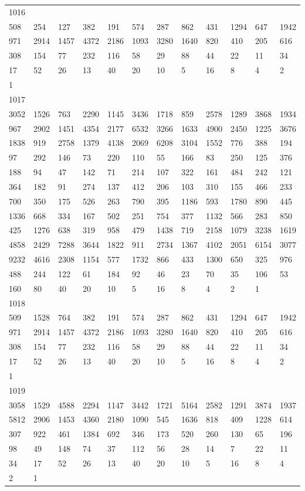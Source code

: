 \begin{longtable}{llllllllllll}
1016&&&&&&&&&&&\\
508& 254& 127& 382& 191& 574& 287& 862& 431& 1294& 647& 1942\\
971& 2914& 1457& 4372& 2186& 1093& 3280& 1640& 820& 410& 205& 616\\
308& 154& 77& 232& 116& 58& 29& 88& 44& 22& 11& 34\\
17& 52& 26& 13& 40& 20& 10& 5& 16& 8& 4& 2\\
1& \\

1017&&&&&&&&&&&\\
3052& 1526& 763& 2290& 1145& 3436& 1718& 859& 2578& 1289& 3868& 1934\\
967& 2902& 1451& 4354& 2177& 6532& 3266& 1633& 4900& 2450& 1225& 3676\\
1838& 919& 2758& 1379& 4138& 2069& 6208& 3104& 1552& 776& 388& 194\\
97& 292& 146& 73& 220& 110& 55& 166& 83& 250& 125& 376\\
188& 94& 47& 142& 71& 214& 107& 322& 161& 484& 242& 121\\
364& 182& 91& 274& 137& 412& 206& 103& 310& 155& 466& 233\\
700& 350& 175& 526& 263& 790& 395& 1186& 593& 1780& 890& 445\\
1336& 668& 334& 167& 502& 251& 754& 377& 1132& 566& 283& 850\\
425& 1276& 638& 319& 958& 479& 1438& 719& 2158& 1079& 3238& 1619\\
4858& 2429& 7288& 3644& 1822& 911& 2734& 1367& 4102& 2051& 6154& 3077\\
9232& 4616& 2308& 1154& 577& 1732& 866& 433& 1300& 650& 325& 976\\
488& 244& 122& 61& 184& 92& 46& 23& 70& 35& 106& 53\\
160& 80& 40& 20& 10& 5& 16& 8& 4& 2& 1& \\

1018&&&&&&&&&&&\\
509& 1528& 764& 382& 191& 574& 287& 862& 431& 1294& 647& 1942\\
971& 2914& 1457& 4372& 2186& 1093& 3280& 1640& 820& 410& 205& 616\\
308& 154& 77& 232& 116& 58& 29& 88& 44& 22& 11& 34\\
17& 52& 26& 13& 40& 20& 10& 5& 16& 8& 4& 2\\
1& \\

1019&&&&&&&&&&&\\
3058& 1529& 4588& 2294& 1147& 3442& 1721& 5164& 2582& 1291& 3874& 1937\\
5812& 2906& 1453& 4360& 2180& 1090& 545& 1636& 818& 409& 1228& 614\\
307& 922& 461& 1384& 692& 346& 173& 520& 260& 130& 65& 196\\
98& 49& 148& 74& 37& 112& 56& 28& 14& 7& 22& 11\\
34& 17& 52& 26& 13& 40& 20& 10& 5& 16& 8& 4\\
2& 1& \\


\end{longtable}
